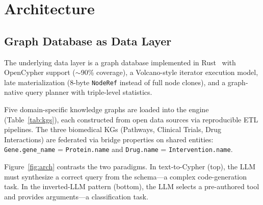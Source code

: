 \documentclass[sigconf]{acmart}
\begin{document}
\section{Architecture}\label{sec:architecture}

\subsection{Graph Database as Data Layer}

The underlying data layer is a graph database implemented in
Rust~\cite{mandarapu2026samyama} with OpenCypher support (${\sim}$90\%
coverage), a Volcano-style iterator execution model, late
materialization (8-byte \texttt{NodeRef} instead of full node clones),
and a graph-native query planner with triple-level statistics.

Five domain-specific knowledge graphs are loaded into the engine
(Table~\ref{tab:kgs}), each constructed from open data sources
via reproducible ETL pipelines.  The three biomedical KGs
(Pathways, Clinical Trials, Drug Interactions) are federated
via bridge properties on shared entities: \texttt{Gene.gene\_name}
= \texttt{Protein.name} and \texttt{Drug.name} =
\texttt{Intervention.name}.

Figure~\ref{fig:arch} contrasts the two paradigms.
In text-to-Cypher (top), the LLM must synthesize a correct query
from the schema---a complex code-generation task.
In the inverted-LLM pattern (bottom), the LLM selects a
pre-authored tool and provides arguments---a classification task.
\end{document}
